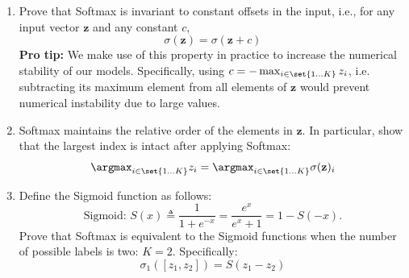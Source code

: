 \begin{enumerate}
    \item  Prove that Softmax is invariant to constant offsets in the input, i.e., for any input vector \label{subsec:5.1}
    $\mathbf{z}$ and any constant $c$,
    $$
        \sigma(\mathbf{z}) = \sigma(\mathbf{z} + c) 
    $$
    \textbf{Pro tip: } We make use of this property in practice to increase the numerical stability of our models. 
    Specifically, using  $c = - \max_{i \in \set{1 ... K}} z_i$, i.e. subtracting its maximum element from all elements of $\mathbf{z}$ would prevent numerical instability  due to large values. \\
    
    \item Softmax maintains the relative order of the elements in $\mathbf{z}$. In particular, show that the largest index is intact after applying Softmax: 
    $$
        \argmax_{i \in \set{1 ... K}} z_i =  \argmax_{i \in \set{1 ... K}}  \sigma(\mathbf{z})_i
    $$
    \item Define the Sigmoid function as follows: 
    $$
        \text{Sigmoid: } S(x) \triangleq \frac{1}{1 + e^{-x}} = \frac{e^x}{e^x + 1}=1-S(-x). 
    $$
    Prove that Softmax is equivalent to the Sigmoid functions when the number of possible labels is two: $K=2$. Specifically: 
    $$ \sigma_1([z_1, z_2]) = S(z_1 - z_2) $$
    \\
    
   
\end{enumerate}

